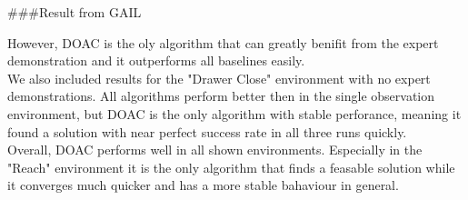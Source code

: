 ###Result from GAIL

However, DOAC is the oly algorithm that can greatly benifit from the expert demonstration and 
it outperforms all baselines easily. \\

We also included results for the "Drawer Close" environment with no expert demonstrations. All algorithms perform better then in the single observation environment, 
but DOAC is the only algorithm with stable perforance, meaning it found a solution with near perfect success rate in all three runs quickly. \\
Overall, DOAC performs well in all shown environments. Especially in the "Reach" environment it is the only algorithm that finds a feasable solution while it 
converges much quicker and has a more stable bahaviour in general. 

